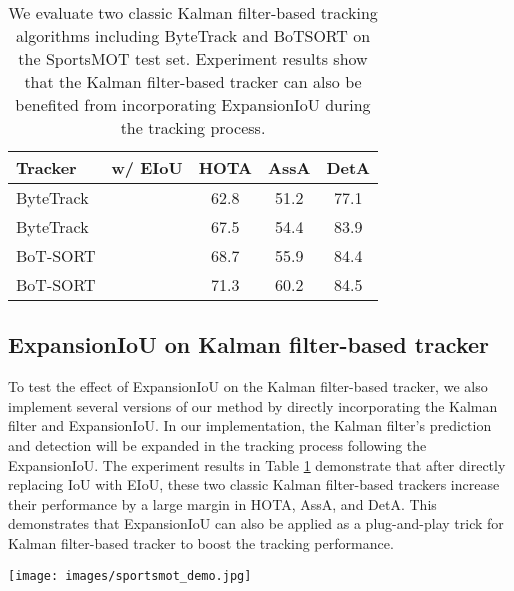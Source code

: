 \documentclass[10pt,twocolumn,letterpaper]{article}
\begin{document}
\begin{table}[h]
\centering
\begin{tabular}{lcccc}
\hline
Tracker   & w/ EIoU & HOTA & AssA & DetA \\ \hline
ByteTrack &              & 62.8 & 51.2 & 77.1\\
ByteTrack &  & 67.5 & 54.4 & 83.9\\
BoT-SORT   &              & 68.7 & 55.9 & 84.4\\
BoT-SORT   &  & 71.3 & 60.2 & 84.5\\
\hline
\end{tabular}
\caption{We evaluate two classic Kalman filter-based tracking algorithms including ByteTrack \cite{ByteTrack} and BoTSORT \cite{aharon2022bot} on the SportsMOT test set. Experiment results show that the Kalman filter-based tracker can also be benefited from incorporating ExpansionIoU during the tracking process.}
\label{table:kf-eiou}
\end{table}


\subsection{ExpansionIoU on Kalman filter-based tracker}

To test the effect of ExpansionIoU on the Kalman filter-based tracker, we also implement several versions of our method by directly incorporating the Kalman filter and ExpansionIoU. In our implementation, the Kalman filter's prediction and detection will be expanded in the tracking process following the ExpansionIoU. The experiment results in Table \ref{table:kf-eiou} demonstrate that after directly replacing IoU with EIoU, these two classic Kalman filter-based trackers increase their performance by a large margin in HOTA, AssA, and DetA. This demonstrates that ExpansionIoU can also be applied as a plug-and-play trick for Kalman filter-based tracker to boost the tracking performance.

\begin{figure*}[t]
\texttt{[image: images/sportsmot\_demo.jpg]}
\centering
\caption{Visualization results of Deep-EIoU from random sampled clips of SportsMOT dataset (row 1 to 3) and SoccerNet-Tracking dataset (row 4 to 5). With the iterative scale-up ExpansionIoU and deep features association, our algorithm can achieve robust multi-athlete tracking under severe occlusion conditions in multiple diverse sports scenarios including basketball, football, and volleyball. More visualization results can be found in supplementary material.}
\end{figure*}
\end{document}
